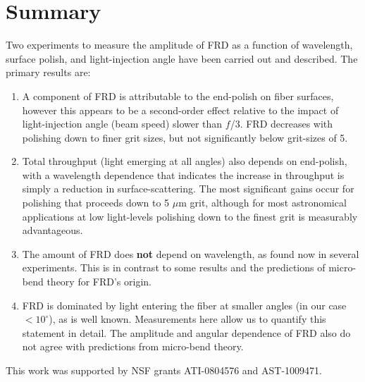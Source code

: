 \section{Summary}
\label{sec:summary}
Two experiments to 
measure the
amplitude of FRD as a function of wavelength, surface polish, 
and light-injection angle have been carried out and described.
The primary results are:
\begin{enumerate}

\item A component of FRD is attributable to the end-polish
  on fiber surfaces, however this appears to be a second-order effect
  relative to the impact of light-injection angle (beam speed) slower
  than $f$/3. FRD decreases with polishing down to finer grit sizes, but
  not significantly below grit-sizes of 5\mum.

\item Total throughput (light emerging at all angles) also depends on
  end-polish, with a wavelength dependence that indicates the increase
  in throughput is simply a reduction in surface-scattering.  The most
  significant gains occur for polishing that proceeds down to 5 $\mu$m
  grit, although for most astronomical applications at low
  light-levels polishing down to the finest grit is measurably
  advantageous.

\item The amount of FRD does \textbf{not} depend on wavelength, as
  found now in several experiments. This is in contrast to some
  results and the predictions of micro-bend theory for FRD's
  origin\cite{Carrasco}.

\item FRD is dominated by light entering the fiber at smaller angles
  (in our case $<10^{\circ}$), as is well known. Measurements here
  allow us to quantify this statement in detail. The amplitude and
  angular dependence of FRD also do not agree with predictions from
  micro-bend theory.

\end{enumerate}

This work was supported by NSF grants ATI-0804576 and AST-1009471.



